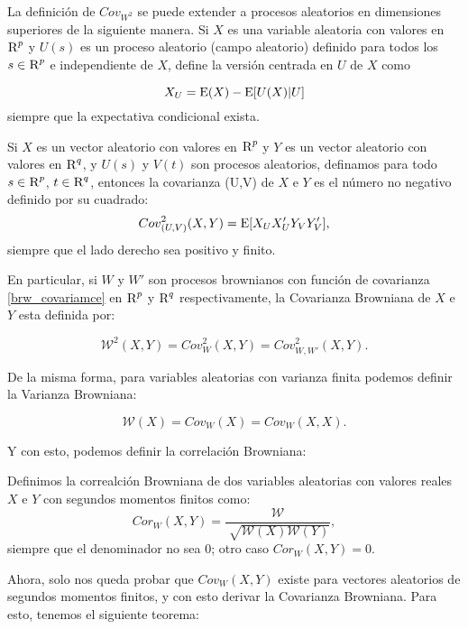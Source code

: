		La definición de ${Cov}_{{W}^2}$ se puede extender a procesos aleatorios en dimensiones superiores de la siguiente manera. Si $X$ es una variable aleatoria con valores en $\textsc{R}^p$ y $U(s)$ es un proceso aleatorio (campo aleatorio) definido para todos los $s \in \textsc{R}^p$ e independiente de $X$, define la versión centrada en $U$ de $X$ como

		$$
			X_U=\operatorname{E}(X)-\operatorname{E}[U(X)|U]
		$$
		siempre que la expectativa condicional exista.

		\begin{defn}
			Si $X$ es un vector aleatorio con valores en $\textsc{R}^p$ y $Y$ es un vector aleatorio con valores en $\textsc{R}^q$, y $U(s)$ y $V(t)$ son procesos aleatorios, definamos para todo $s\in\textsc{R}^p$, $t\in\textsc{R}^q$, entonces la covarianza (U,V) de $X$ e $Y$ es el n\'umero no negativo definido por su cuadrado:
			$$
				{Cov}^2_{(U,V)}(X,Y) = \operatorname{E}[X_U X'_U Y_V Y'_V],
			$$
			siempre que el lado derecho sea positivo y finito.
		\end{defn}

		En particular, si ${W}$ y ${W'}$ son procesos brownianos con funci\'on de covarianza \ref{brw_covariamce} en $\textsc{R}^p$ y $\textsc{R}^q$ respectivamente, la Covarianza Browniana de $X$ e $Y$ esta definida por:

		\begin{equation}
			\mathcal{W}^2(X,Y) = Cov^2_W(X,Y) = Cov^2_{W,W'}(X,Y).
		\end{equation}

		De la misma forma, para variables aleatorias con varianza finita podemos definir la Varianza Browniana:

		\begin{equation}
			\mathcal{W}(X) = Cov_W(X) = Cov_{W}(X,X).
		\end{equation}
		
		Y con esto, podemos definir la correlaci\'on Browniana:
		
		\begin{defn}
			Definimos la correalci\'on Browniana de dos variables aleatorias con valores reales $X$ e $Y$ con segundos momentos finitos como:
			\begin{equation}	
				Cor_W(X,Y) = \frac{\mathcal{W}}{\sqrt[]{\mathcal{W}(X)\mathcal{W}(Y)}},
			\end{equation}
			siempre que el denominador no sea 0; otro caso $Cor_W(X,Y) = 0$.
		\end{defn}

		Ahora, solo nos queda probar que $Cov_W(X,Y)$ existe para vectores aleatorios de segundos momentos finitos, y con esto derivar la Covarianza Browniana. Para esto, tenemos el siguiente teorema:

